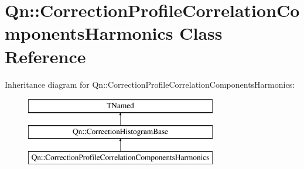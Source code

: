 \hypertarget{classQn_1_1CorrectionProfileCorrelationComponentsHarmonics}{}\section{Qn\+:\+:Correction\+Profile\+Correlation\+Components\+Harmonics Class Reference}
\label{classQn_1_1CorrectionProfileCorrelationComponentsHarmonics}
Inheritance diagram for Qn\+:\+:Correction\+Profile\+Correlation\+Components\+Harmonics\+:\begin{figure}[H]
\begin{center}
\leavevmode
\includegraphics[height=3.000000cm]{classQn_1_1CorrectionProfileCorrelationComponentsHarmonics}
\end{center}
\end{figure}
